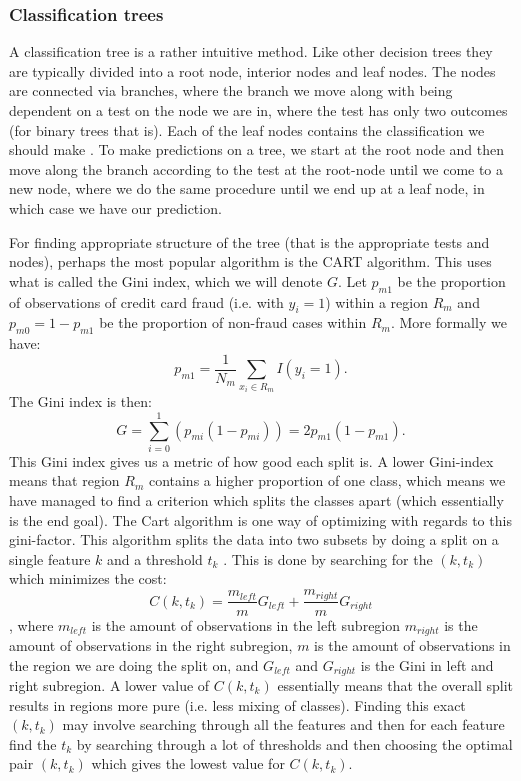 \documentclass{article}
\begin{document}
\subsubsection{Classification trees}
A classification tree is a rather intuitive method. Like other decision trees they are
typically divided into a root node, interior nodes and leaf nodes. The nodes
are connected via branches, where the branch we move along with being dependent
on a test on the node we are in, where the test has only two outcomes (for
binary trees that is). Each of the leaf nodes contains the classification we
should make \cite{lecturesweek46}. To make predictions on a tree, we start at the
root node and then move along the branch according to the test at the root-node
until we come to a new node, where we do the same procedure until we end up at a
leaf node, in which case we have our prediction.

For finding appropriate structure of the tree (that is the appropriate tests
and nodes), perhaps the most popular algorithm is the CART algorithm. This uses
what is called the Gini index, which we will denote $G$. Let $p_{m 1}$ be the
proportion of observations of credit card fraud (i.e. with $y_i = 1$) within a
region $R_m$ and $p_{m 0} = 1 - p_{m 1}$ be the proportion of non-fraud cases
within $R_m$. More formally we have:
$$p_{m 1} = \frac{1}{N_m} \sum_{x_i \in R_m} I(y_i = 1).$$
The Gini index is then:
\[
	G = \sum_{i=0}^{1} (p_{m i} (1 - p_{m i})) = 2 p_{m 1} (1 - p_{m 1}).
\]
This Gini index gives us a metric of how good each split is. A lower
Gini-index means that region $R_m$ contains a higher proportion of one class,
which means we have managed to find a criterion which splits the classes apart
(which essentially is the end goal).  The Cart algorithm is one way of
optimizing with regards to this gini-factor. This algorithm splits the data into
two subsets by doing a split on a single feature $k$ and a threshold $t_k$
\cite[s.~The CART algorithm for Classification]{lecturesweek46}. This is done by
searching for the $(k, t_{k})$ which minimizes the cost:
\[
	C(k, t_k) = \frac{m_{left}}{m} G_{left} + \frac{m_{right}}{m} G_{right}
\]
\cite[s.~Classification tree, how to split nodes]{lecturesweek46}, where
$m_{left}$ is the amount of observations in the left subregion $m_{right}$ is the
amount of observations in the right subregion, $m$ is the amount of observations in
the region we are doing the split on, and $G_{left}$ and $G_{right}$ is the Gini
in left and right subregion. A lower value of $C(k, t_k)$ essentially means that
the overall split results in regions more pure (i.e. less mixing of classes).
Finding this exact $(k, t_k)$ may involve searching through all the features and
then for each feature find the $t_k$ by searching through a lot of thresholds
and then choosing the optimal pair $(k, t_k)$ which gives the lowest value for
$C(k, t_k)$.
\end{document}
